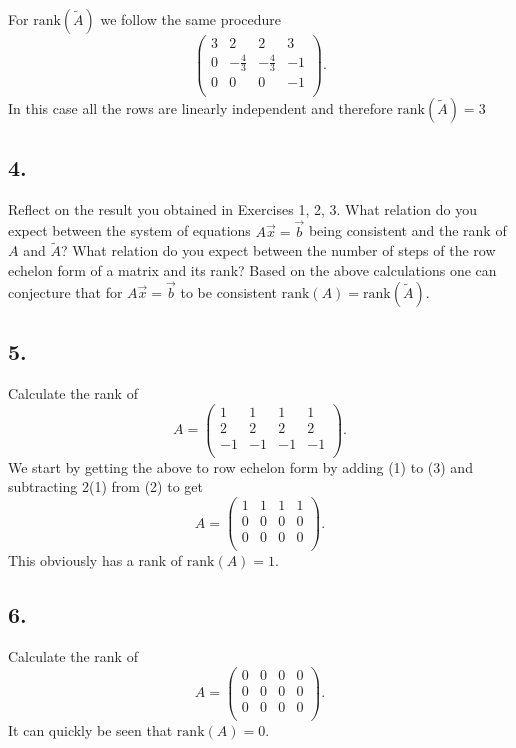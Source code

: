 For $\mathrm{rank}(\tilde{A})$ we follow the same procedure
\[ 
\left( \begin{array}{ccc|c}
3 & 2 & 2 & 3\\
0 & -\frac{4}{3} & -\frac{4}{3} & -1\\
0 & 0 & 0 & -1\\
\end{array} \right)
.\]
In this case all the rows are linearly independent and therefore $\mathrm{rank}(\tilde{A}) = 3$




\subsection*{4.}
Reflect on the result you obtained in Exercises 1, 2, 3. What relation do you expect between the system of equations $A \Vec{x} = \Vec{b}$ being consistent and the rank of $A$ and $\tilde{A}$? What relation do you expect between the number of steps of the row echelon form of a matrix and its rank?
\bigbreak
Based on the above calculations one can conjecture that for $A \Vec{x} = \Vec{b}$ to be consistent $\mathrm{rank}(A) = \mathrm{rank}(\tilde{A})$.

\subsection*{5.}
Calculate the rank of
\[ 
A = \begin{pmatrix}
1 & 1 & 1 & 1\\
2 & 2 & 2 & 2\\
-1 & -1 & -1 & -1\\
\end{pmatrix}
.\]
\bigbreak
We start by getting the above to row echelon form by adding (1) to (3) and subtracting 2(1) from (2) to get
\[ 
A = \begin{pmatrix}
1 & 1 & 1 & 1\\
0 & 0 & 0 & 0\\
0 & 0 & 0 & 0\\
\end{pmatrix}
.\]
This obviously has a rank of $\mathrm{rank}(A) = 1$.

\subsection*{6.}
Calculate the rank of
\[ 
A = \begin{pmatrix}
0 & 0 & 0 & 0\\
0 & 0 & 0 & 0\\
0 & 0 & 0 & 0\\
\end{pmatrix}
.\]
\bigbreak
It can quickly be seen that $\mathrm{rank}(A) = 0$.
